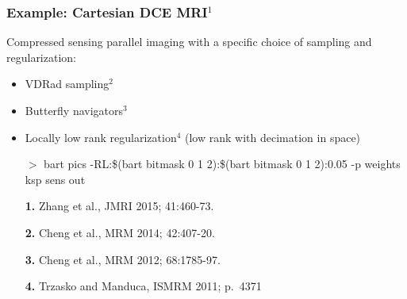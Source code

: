 \documentclass{beamer}
\begin{document}
\begin{frame}
\frametitle{Example: Cartesian DCE MRI$^1$}

Compressed sensing parallel imaging with a
specific choice of sampling and regularization:
\vspace{0.3cm}
\begin{itemize}
\item {VDRad sampling$^2$}
\item {\color{red}Butterfly navigators$^3$}
\vspace{0.3cm}
\item {\color{yellow}Locally low rank regularization$^4$} (low rank with decimation in {\color{blue}space})
\item[$>$] bart pics -R{\color{yellow}L}:{\color{blue}\$(bart bitmask 0 1 2)}:{\color{blue}\$(bart bitmask 0 1
  2)}:{\color{pink}0.05}  {\color{red}-p weights} ksp {\color{green}sens} out
\end{itemize}



\vfill
{\tiny
\begin{itemize}
\item[] {\bf 1.} Zhang et al., JMRI 2015; 41:460-73.
\item[] {\bf 2.} Cheng et al., MRM 2014; 42:407-20.
\item[] {\bf 3.} Cheng et al., MRM 2012; 68:1785-97.
\item[] {\bf 4.} Trzasko and Manduca,  ISMRM 2011; p.\ 4371
\end{itemize}
}

\end{frame}
\end{document}
